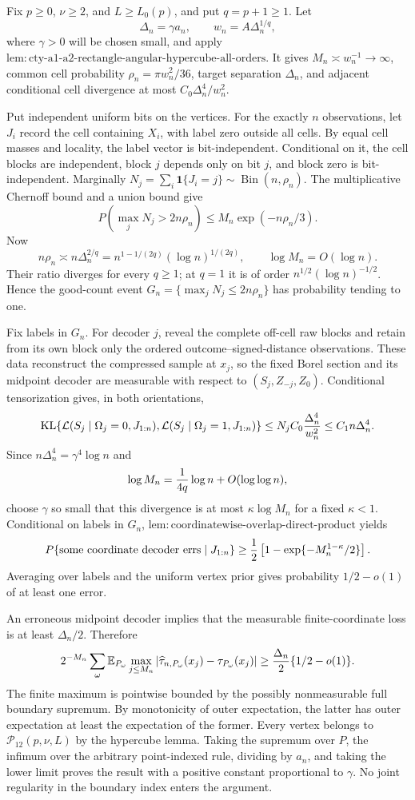 Fix \(p\geq0\), \(\nu\geq2\), and \(L\geq L_0(p)\), and put \(q=p+1\geq1\).  Let
\[
 \Delta_n=\gamma a_n,
 \qquad w_n=A\Delta_n^{1/q},
\]
where \(\gamma>0\) will be chosen small, and apply \(\mathrm{lem:cty\text{-}a1\text{-}a2\text{-}rectangle\text{-}angular\text{-}hypercube\text{-}all\text{-}orders}\).  It gives \(M_n\asymp w_n^{-1}\to\infty\), common cell probability \(\rho_n=\pi w_n^2/36\), target separation \(\Delta_n\), and adjacent conditional cell divergence at most \(C_0\Delta_n^4/w_n^2\).

Put independent uniform bits on the vertices.  For the exactly \(n\) observations, let \(J_i\) record the cell containing \(X_i\), with label zero outside all cells.  By equal cell masses and locality, the label vector is bit-independent.  Conditional on it, the cell blocks are independent, block \(j\) depends only on bit \(j\), and block zero is bit-independent.  Marginally \(N_j=\sum_i\mathbf1\{J_i=j\}\sim\operatorname{Bin}(n,\rho_n)\).  The multiplicative Chernoff bound and a union bound give
\[
 P\!\left(\max_jN_j>2n\rho_n\right)
 \leq M_n\exp(-n\rho_n/3).
\]
Now
\[
 n\rho_n\asymp n\Delta_n^{2/q}
 =n^{1-1/(2q)}(\log n)^{1/(2q)},
 \qquad \log M_n=O(\log n).
\]
Their ratio diverges for every \(q\geq1\); at \(q=1\) it is of order \(n^{1/2}(\log n)^{-1/2}\).  Hence the good-count event \(G_n=\{\max_jN_j\leq2n\rho_n\}\) has probability tending to one.

Fix labels in \(G_n\).  For decoder \(j\), reveal the complete off-cell raw blocks and retain from its own block only the ordered outcome--signed-distance observations.  These data reconstruct the compressed sample at \(x_j\), so the fixed Borel section and its midpoint decoder are measurable with respect to \((S_j,Z_{-j},Z_0)\).  Conditional tensorization gives, in both orientations,
\[
 \operatorname{KL}\{\mathcal L(S_j\mid\Omega_j=0,J_{1:n}),
 \mathcal L(S_j\mid\Omega_j=1,J_{1:n})\}
 \leq N_jC_0{\Delta_n^4\over w_n^2}
 \leq C_1n\Delta_n^4.
\]
Since \(n\Delta_n^4=\gamma^4\log n\) and
\[
 \log M_n={1\over4q}\log n+O(\log\log n),
\]
choose \(\gamma\) so small that this divergence is at most \(\kappa\log M_n\) for a fixed \(\kappa<1\).  Conditional on labels in \(G_n\), \(\mathrm{lem:coordinatewise\text{-}overlap\text{-}direct\text{-}product}\) yields
\[
 P\{\text{some coordinate decoder errs}\mid J_{1:n}\}
 \geq {1\over2}\left[1-\exp\{-M_n^{1-\kappa}/2\}\right].
\]
Averaging over labels and the uniform vertex prior gives probability \(1/2-o(1)\) of at least one error.

An erroneous midpoint decoder implies that the measurable finite-coordinate loss is at least \(\Delta_n/2\).  Therefore
\[
 2^{-M_n}\sum_\omega
 \mathbb E_{P_\omega}\max_{j\leq M_n}
 |\widehat\tau_{n,P_\omega}(x_j)-\tau_{P_\omega}(x_j)|
 \geq {\Delta_n\over2}\{1/2-o(1)\}.
\]
The finite maximum is pointwise bounded by the possibly nonmeasurable full boundary supremum.  By monotonicity of outer expectation, the latter has outer expectation at least the expectation of the former.  Every vertex belongs to \(\mathcal P_{12}(p,\nu,L)\) by the hypercube lemma.  Taking the supremum over \(P\), the infimum over the arbitrary point-indexed rule, dividing by \(a_n\), and taking the lower limit proves the result with a positive constant proportional to \(\gamma\).  No joint regularity in the boundary index enters the argument.